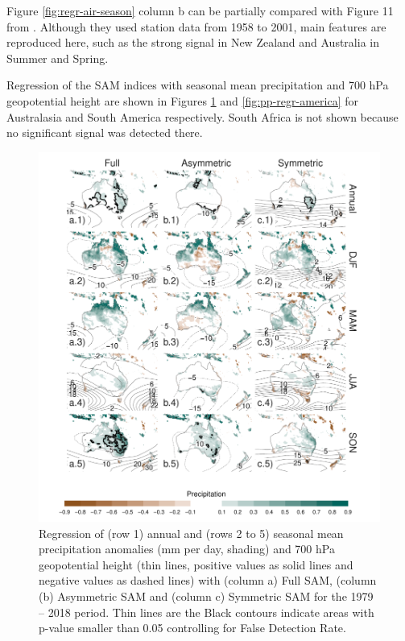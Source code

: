 \documentclass[smallextended]{svjour3}       %
\begin{document}
Figure \ref{fig:regr-air-season} column b can be partially compared with Figure 11 from \citet{fogt2012}. Although they used station data from 1958 to 2001, main features are reproduced here, such as the strong signal in New Zealand and Australia in Summer and Spring.

Regression of the SAM indices with seasonal mean precipitation and 700 hPa geopotential height are shown in Figures \ref{fig:pp-regr-oceania} and \ref{fig:pp-regr-america} for Australasia and South America respectively. South Africa is not shown because no significant signal was detected there.

\begin{figure}
\includegraphics{pp-regr-oceania-1} \caption{Regression of (row 1) annual and (rows 2 to 5) seasonal mean precipitation anomalies (mm per day, shading) and 700 hPa geopotential height (thin lines, positive values as solid lines and negative values as dashed lines) with (column a) Full SAM, (column (b) Asymmetric SAM and (column c) Symmetric SAM for the 1979 -- 2018 period. Thin lines are the Black contours indicate areas with p-value smaller than 0.05 controlling for False Detection Rate.}\label{fig:pp-regr-oceania}
\end{figure}
\end{document}
